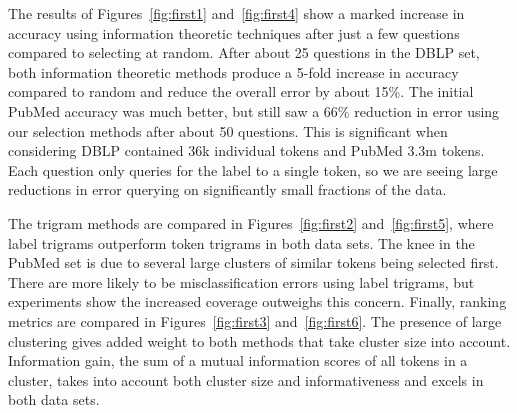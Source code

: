 
The results of Figures~\ref{fig:first1} and~\ref{fig:first4} show a marked increase in accuracy using information theoretic techniques after just a few questions compared to selecting at random.  After about 25 questions in the DBLP set, both information theoretic methods produce a 5-fold increase in accuracy compared to random and reduce the overall error by about 15\%.  The initial PubMed accuracy was much better, but still saw a 66\% reduction in error using our selection methods after about 50 questions.  This is significant when considering DBLP contained 36k individual tokens and PubMed 3.3m tokens.  Each question only queries for the label to a single token, so we are seeing large reductions in error querying on significantly small fractions of the data. 

The trigram methods are compared in Figures~\ref{fig:first2} and~\ref{fig:first5}, where label trigrams outperform token trigrams in both data sets.  The knee in the PubMed set is due to several large clusters of similar tokens being selected first.  There are more likely to be misclassification errors using label trigrams, but experiments show the increased coverage outweighs this concern.  Finally, ranking metrics are compared in Figures~\ref{fig:first3} and~\ref{fig:first6}.  The presence of large clustering gives added weight to both methods that take cluster size into account.  Information gain, the sum of a mutual information scores of all tokens in a cluster, takes into account both cluster size and informativeness and excels in both data sets.


